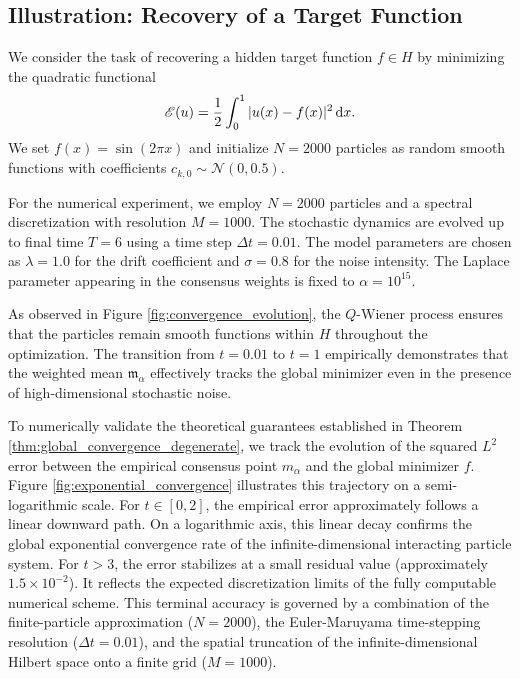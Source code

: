 \documentclass[12pt]{amsart}
\newcommand{\D}[1]{\mbox{\rm #1}}
\newcommand{\dd}{\D{d}}
\numberwithin{equation}{section}
\begin{document}

\subsection{Illustration: Recovery of a Target Function}

We consider the task of recovering a hidden target function $f \in H$ by minimizing the quadratic functional 
\begin{equation*}
    \mathscr{E}(u) = \frac{1}{2} \int_0^1 |u(x) - f(x)|^2\, \dd x.
\end{equation*}
We set $f(x) = \sin(2\pi x)$ and initialize $N=2000$ particles as random smooth functions with coefficients $c_{k,0} \sim \mathcal{N}(0, 0.5)$.


For the numerical experiment, we employ $N=2000$ particles and a spectral discretization with resolution $M=1000$. The stochastic dynamics are evolved up to final time $T=6$ using a time step $\Delta t=0.01$. The model parameters are chosen as $\lambda=1.0$ for the drift coefficient and $\sigma=0.8$ for the noise intensity. The Laplace parameter appearing in the consensus weights is fixed to $\alpha=10^{15}$.


As observed in Figure \ref{fig:convergence_evolution}, the $Q$-Wiener process ensures that the particles remain smooth functions within $H$ throughout the optimization. The transition from $t=0.01$ to $t=1$ empirically  demonstrates that the weighted mean $\mathfrak{m}_{\alpha}$ effectively tracks the global minimizer even in the presence of high-dimensional stochastic noise.

\newpage

To numerically validate the theoretical guarantees established in Theorem \ref{thm:global_convergence_degenerate}, we track the evolution of the squared $L^2$ error between the empirical consensus point $m_\alpha$ and the global minimizer $f$. 
Figure \ref{fig:exponential_convergence} illustrates this trajectory on a semi-logarithmic scale. For $t \in [0, 2]$, the empirical error approximately follows a linear downward path. On a logarithmic axis, this linear decay confirms the global exponential convergence rate  of the infinite-dimensional interacting particle system. For $t > 3$, the error stabilizes at a small residual value (approximately $1.5 \times 10^{-2}$). It reflects the expected discretization limits of the fully computable numerical scheme. This terminal accuracy is governed by a combination of the finite-particle approximation ($N=2000$), the Euler-Maruyama time-stepping resolution ($\Delta t = 0.01$), and the spatial truncation of the infinite-dimensional Hilbert space onto a finite grid ($M=1000$). 
\end{document}
